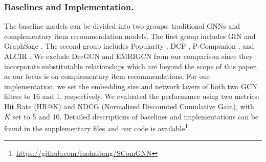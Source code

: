 \documentclass[letterpaper]{article} %
\begin{document}
 \subsubsection{Baselines and Implementation.}
 The baseline models can be divided into two groups: traditional GNNs and complementary item recommendation models. The first group includes GIN \cite{xu2018powerful} and GraphSage \cite{hamilton2017inductive}. The second group includes Popularity \cite{bibas2023semi}, DCF \cite{galron2018deep}, P-Companion \cite{hao2020p}, and ALCIR \cite{bibas2023semi}. We exclude DecGCN \cite{liu2020decoupled} and EMRIGCN \cite{chen2023enhanced} from our comparison since they incorporate substitutable relationships which are beyond the scope of this paper, as our focus is on complementary item recommendations. For our implementation, we set the embedding size and network layers of both two GCN filters to 16 and 1, respectively. We evaluated the performance using two metrics: Hit Rate (HR@K) and NDCG (Normalized Discounted Cumulative Gain), with $K$ set to 5 and 10. Detailed descriptions of baselines and implementations can be found in the supplementary files and our code is available\footnote{\url{https://github.com/luohaitong/SComGNN}}.

\end{document}
